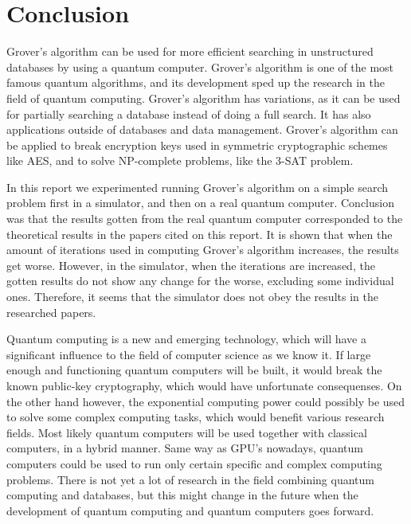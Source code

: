 \documentclass[english,oneside,openright]{UH_DS_report}
\begin{document}
\chapter{Conclusion}
\label{chpater:conclusion}

Grover's algorithm can be used for more efficient searching in unstructured databases by using a quantum computer. Grover's algorithm is one of the most famous quantum algorithms, and its development sped up the research in the field of quantum computing. Grover's algorithm has variations, as it can be used for partially searching a database instead of doing a full search. It has also applications outside of databases and data management. Grover's algorithm can be applied to break encryption keys used in symmetric cryptographic schemes like AES, and to solve NP-complete problems, like the 3-SAT problem.

In this report we experimented running Grover's algorithm on a simple search problem first in a simulator, and then on a real quantum computer. Conclusion was that the results gotten from the real quantum computer corresponded to the theoretical results in the papers cited on this report. It is shown that when the amount of iterations used in computing Grover's algorithm increases, the results get worse. However, in the simulator, when the iterations are increased, the gotten results do not show any change for the worse, excluding some individual ones. Therefore, it seems that the simulator does not obey the results in the researched papers.

Quantum computing is a new and emerging technology, which will have a significant influence to the field of computer science as we know it. If large enough and functioning quantum computers will be built, it would break the known public-key cryptography, which would have unfortunate consequenses. On the other hand however, the exponential computing power could possibly be used to solve some complex computing tasks, which would benefit various research fields. Most likely quantum computers will be used together with classical computers, in a hybrid manner. Same way as GPU's nowadays, quantum computers could be used to run only certain specific and  complex computing problems. There is not yet a lot of research in the field combining quantum computing and databases, but this might change in the future when the development of quantum computing and quantum computers goes forward.
\end{document}
